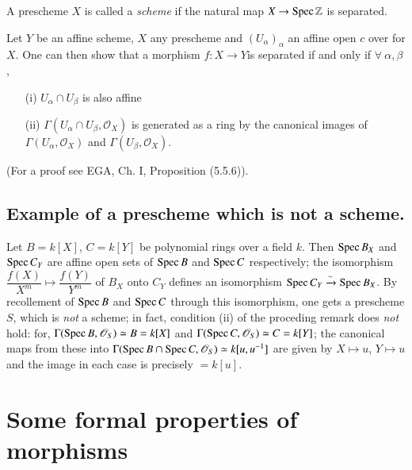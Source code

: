A prescheme $X$ is called a {\em scheme} if the natural map $X\to \operatorname{Spec}\mathbb{Z}$ is separated.

\begin{remark*}
Let $Y$ be an affine scheme, $X$ any prescheme and
$(U_{\alpha})_{\alpha}$ an affine open $c$ over for $X$. One can then
show that a morphism $f:X\to Y$\pageoriginale  is separated if and
only if $\forall\ \alpha,\beta$,
\begin{itemize}
\item[\rm(i)] $U_{\alpha}\cap U_{\beta}$ is also affine

\item[\rm(ii)] $\Gamma(U_{\alpha}\cap U_{\beta},\mathcal{O}_{X})$ is
  generated as a ring by the canonical images of
  $\Gamma(U_{\alpha},\mathscr{O}_{X})$ and $\Gamma(U_{\beta},\mathscr{O}_{X})$.
\end{itemize}
\end{remark*}

(For a proof see EGA, Ch. I, Proposition (5.5.6)).

\subsection{Example of a prescheme which is not a
  scheme.}\label{chap2-sec2.4.3}%

Let $B=k[X]$, $C=k[Y]$ be polynomial rings over a field $k$. Then
$\operatorname{Spec} B_{X}$ and $\operatorname{Spec} C_{Y}$ are affine open sets of $\operatorname{Spec} B$ and
$\operatorname{Spec} C$ respectively; the isomorphism $\dfrac{f(X)}{X^{m}}\mapsto
\dfrac{f(Y)}{Y^{m}}$ of $B_{X}$ onto $C_{Y}$ defines an isomorphism
$\operatorname{Spec} C_{Y}\xrightarrow{\sim}\operatorname{Spec} B_{X}$. By recollement of $\operatorname{Spec}
B$ and $\operatorname{Spec} C$ through this isomorphism, one gets a prescheme $S$,
which is {\em not} a scheme; in fact, condition (ii) of the proceding
remark does {\em not} hold: for, $\Gamma(\operatorname{Spec}
B,\mathscr{O}_{S})\simeq B=k[X]$ and $\Gamma(\operatorname{Spec}
C,\mathscr{O}_{S})\simeq C=k[Y]$; the canonical maps from these into
$\Gamma(\operatorname{Spec} B\cap \operatorname{Spec} C,\mathscr{O}_{S})\simeq k[u,u^{-1}]$ are
given by $X\mapsto u$, $Y\mapsto u$ and the image in each case is
precisely $=k[u]$.

\section{Some formal properties of morphisms}\label{chap2-sec2.5}%

